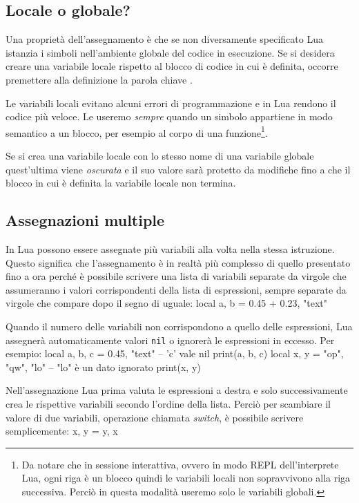 \subsection{Locale o globale?}
\label{secFondLocaleGlobale}

Una proprietà dell'assegnamento è che se non diversamente specificato Lua
istanzia i simboli nell'ambiente globale del codice in esecuzione. Se si
desidera creare una variabile locale rispetto al blocco di codice in cui è
definita, occorre premettere alla definizione la parola chiave .

Le variabili locali evitano alcuni errori di programmazione e in Lua rendono il
codice più veloce. Le useremo \emph{sempre} quando un simbolo appartiene in modo
semantico a un blocco, per esempio al corpo di una funzione\footnote{Da notare
che in sessione interattiva, ovvero in modo REPL dell'interprete Lua, ogni riga
è un blocco quindi le variabili locali non sopravvivono alla riga successiva.
Perciò in questa modalità useremo solo le variabili globali.}.

Se si crea una variabile locale con lo stesso nome di una variabile globale
quest'ultima viene \emph{oscurata} e il suo valore sarà protetto da modifiche
fino a che il blocco in cui è definita la variabile locale non termina.


\subsection{Assegnazioni multiple}

In Lua possono essere assegnate più variabili alla volta nella stessa
istruzione. Questo significa che l'assegnamento è in realtà più complesso di
quello presentato fino a ora perché è possibile scrivere una lista di variabili
separate da virgole che assumeranno i valori corrispondenti della lista di
espressioni, sempre separate da virgole che compare dopo il segno di uguale:
\lines
local a, b = 0.45 + 0.23, "text"
\endlines
{}

Quando il numero delle variabili non corrispondono a quello delle espressioni,
Lua assegnerà automaticamente valori \texttt{nil} o ignorerà le espressioni in
eccesso. Per esempio:
\lines
local a, b, c = 0.45, "text"    -- 'c' vale nil
print(a, b, c)
local x, y = "op", "qw", "lo"   -- "lo" è un dato ignorato
print(x, y)
\endlines
{}

Nell'assegnazione Lua prima valuta le espressioni a destra e solo
successivamente crea le rispettive variabili secondo l'ordine della lista.
Perciò per scambiare il valore di due variabili, operazione chiamata
\emph{switch}, è possibile scrivere semplicemente:
\lines
x, y = y, x
\endlines
{}

